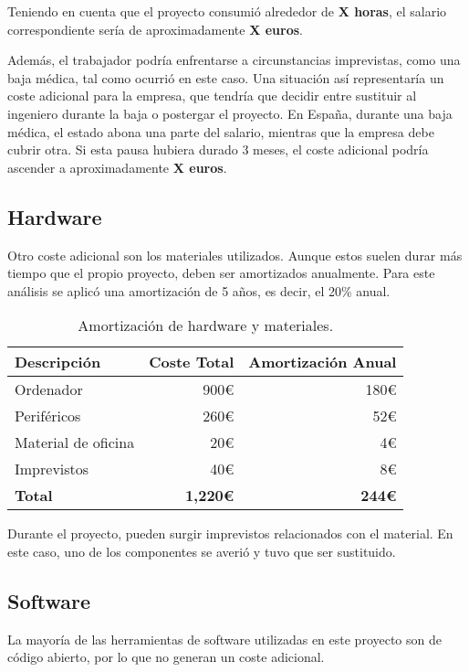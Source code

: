 Teniendo en cuenta que el proyecto consumió alrededor de \textbf{X horas}, el salario correspondiente sería de aproximadamente \textbf{X euros}. 

Además, el trabajador podría enfrentarse a circunstancias imprevistas, como una baja médica, tal como ocurrió en este caso. Una situación así representaría un coste adicional para la empresa, que tendría que decidir entre sustituir al ingeniero durante la baja o postergar el proyecto. En España, durante una baja médica, el estado abona una parte del salario, mientras que la empresa debe cubrir otra. Si esta pausa hubiera durado 3 meses, el coste adicional podría ascender a aproximadamente \textbf{X euros}.

\subsection{Hardware}

Otro coste adicional son los materiales utilizados. Aunque estos suelen durar más tiempo que el propio proyecto, deben ser amortizados anualmente. Para este análisis se aplicó una amortización de 5 años, es decir, el 20\% anual.

\begin{table}[H]
\centering
\begin{tabular}{lrr}
\toprule
Descripción & Coste Total & Amortización Anual \\ 
\midrule
Ordenador & 900€ & 180€ \\
Periféricos & 260€ & 52€ \\
Material de oficina & 20€ & 4€ \\
Imprevistos & 40€ & 8€ \\
\textbf{Total} & \textbf{1,220€} & \textbf{244€} \\ 
\bottomrule
\end{tabular}
\caption{Amortización de hardware y materiales.}
\end{table}

Durante el proyecto, pueden surgir imprevistos relacionados con el material. En este caso, uno de los componentes se averió y tuvo que ser sustituido.

\subsection{Software}

La mayoría de las herramientas de software utilizadas en este proyecto son de código abierto, por lo que no generan un coste adicional.

